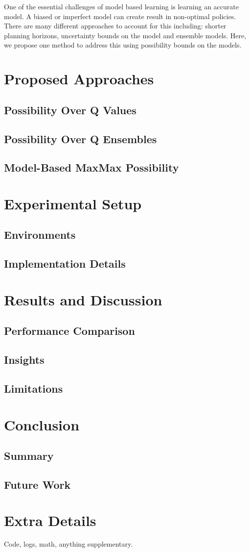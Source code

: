 \documentclass[12pt,a4paper]{report}
\begin{document}
One of the essential challenges of model based learning is learning an accurate model. A biased or imperfect model can create result in non-optimal policies. There are many different approaches to account for this including: shorter planning horizons, uncertainty bounds on the model and ensemble models. Here, we propose one method to address this using possibility bounds on the models. 

\chapter{Proposed Approaches}
\section{Possibility Over Q Values}
\section{Possibility Over Q Ensembles}
\section{Model-Based MaxMax Possibility}

\chapter{Experimental Setup}
\section{Environments}
\section{Implementation Details}

\chapter{Results and Discussion}
\section{Performance Comparison}
\section{Insights}
\section{Limitations}

\chapter{Conclusion}
\section{Summary}
\section{Future Work}




\appendix
\chapter{Extra Details}
Code, logs, math, anything supplementary.
\end{document}
